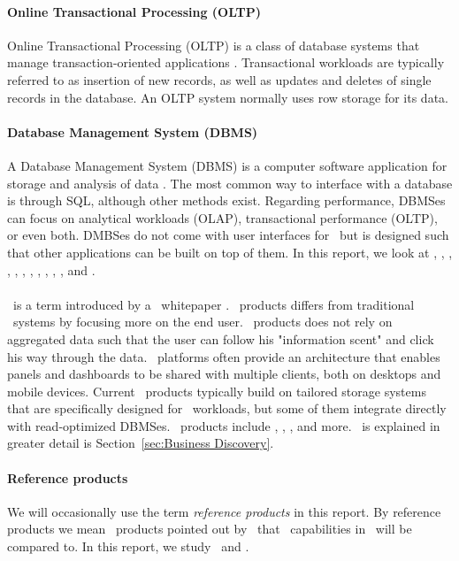{\paragraph{Online Transactional Processing (OLTP)}
\label{par:Online Transactional Processing (OLTP)}
Online Transactional Processing (OLTP) is a class of database systems that manage transaction-oriented applications \cite{Wikipedia_contributors2015-cw}. Transactional workloads are typically referred to as insertion of new records, as well as updates and deletes of single records in the database. An OLTP system normally uses row storage for its data.

\paragraph{Database Management System (DBMS)}
\label{par:Database Management System (DBMS)}
A Database Management System (DBMS) is a computer software application for storage and analysis of data \cite{Wikipedia_contributors2015-pb}. The most common way to interface with a database is through SQL, although other methods exist. Regarding performance, DBMSes can focus on analytical workloads (OLAP), transactional performance (OLTP), or even both. DMBSes do not come with user interfaces for \bd~but is designed such that other applications can be built on top of them. In this report, we look at \oracle, \ibm, \saph, \sapnw, \mssql, \cstore, \vertica, \blink, \exasol, \oracle, \hyper, and \hyrise.

\paragraph{\bd}
\label{par:Business Discovery}
\bd~is a term introduced by a \qlikview~whitepaper \cite{Qlik2014-vd}. \bd~products differs from traditional \bi~systems by focusing more on the end user. \bd~products does not rely on aggregated data such that the user can follow his "information scent" and click his way through the data. \bd~platforms often provide an architecture that enables panels and dashboards to be shared with multiple clients, both on desktops and mobile devices. Current \bd~products typically build on tailored storage systems that are specifically designed for \bd~workloads, but some of them integrate directly with read-optimized DBMSes. \bd~products include \tableau, \qlikview, \powerpivot, and more. \bd~is explained in greater detail is Section~\ref{sec:Business Discovery}.

\paragraph{Reference products}
\label{par:Reference products}
We will occasionally use the term \textit{reference products} in this report. By reference products we mean \bd~products pointed out by \genus~that \bd~capabilities in \genusSoftware~will be compared to. In this report, we study \qlikview~and \tableau.

}

